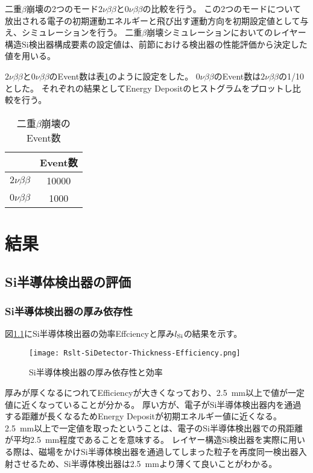 \documentclass[a4paper,10pt]{jreport}
\begin{document}
二重$\beta$崩壊の2つのモード$2\nu\beta\beta$と$0\nu\beta\beta$の比較を行う。
この2つのモードについて放出される電子の初期運動エネルギーと飛び出す運動方向を初期設定値として与え、シミュレーションを行う。
二重$\beta$崩壊シミュレーションにおいてのレイヤー構造Si検出器構成要素の設定値は、前節における検出器の性能評価から決定した値を用いる。

$2\nu\beta\beta$と$0\nu\beta\beta$のEvent数は表\ref{Tab-DoubleBetaDecay}のように設定をした。
$0\nu\beta\beta$のEvent数は$2\nu\beta\beta$の1/10とした。
それぞれの結果としてEnergy Depositのヒストグラムをプロットし比較を行う。

\begin{table}[H] 
	\center
	\caption{二重$\beta$崩壊のEvent数} \label{Tab-DoubleBetaDecay}
	\begin{tabular}{cc}
	\hline
	 & Event数 \\
	 \hline
	$2\nu\beta\beta$ & 10000 \\
	$0\nu\beta\beta$ & 1000 \\
	\hline
	\end{tabular}
\end{table}



\chapter{結果}



\section{Si半導体検出器の評価}

\subsection{Si半導体検出器の厚み依存性}

図\ref{Rslt-SiDetector-Thickness-Efficiency}にSi半導体検出器の効率Effciencyと厚み$l_{\rm{Si}}$の結果を示す。

\begin{figure}[H]
	\center
	\texttt{[image: Rslt-SiDetector-Thickness-Efficiency.png]}
	\caption{Si半導体検出器の厚み依存性と効率} \label{Rslt-SiDetector-Thickness-Efficiency}
\end{figure}

厚みが厚くなるにつれてEfficiencyが大きくなっており、\SI{2.5}{mm}以上で値が一定値に近くなっていることが分かる。
厚い方が、電子がSi半導体検出器内を通過する距離が長くなるためEnergy Depositが初期エネルギー値に近くなる。
\SI{2.5}{mm}以上で一定値を取ったということは、電子のSi半導体検出器での飛距離が平均\SI{2.5}{mm}程度であることを意味する。
レイヤー構造Si検出器を実際に用いる際は、磁場をかけSi半導体検出器を通過してしまった粒子を再度同一検出器入射させるため、Si半導体検出器は\SI{2.5}{mm}より薄くて良いことがわかる。
\end{document}
